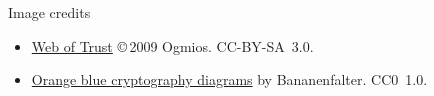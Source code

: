 \documentclass[
mode=present,
paper=smartboard,
size=20pt,
]{powerdot}
\begin{document}
\begin{slide}[toc=]{Image credits}

  \begin{itemize}
  \item \href{https://commons.wikimedia.org/wiki/File:Web_of_Trust.svg}{Web of Trust} \copyright\,2009 Ogmios. CC-BY-SA~3.0.
  \item \href{https://commons.wikimedia.org/wiki/Category:Orange_blue_cryptography_diagrams}{Orange blue cryptography diagrams} by Bananenfalter. CC0~1.0.
  \end{itemize}

\end{slide}
\end{document}
